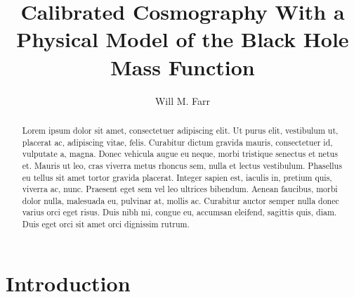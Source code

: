 \documentclass[modern]{aastex631}
\newcommand{\todo}[1]{\textcolor{cyan}{TODO: #1}}
\begin{document}
\title{Calibrated Cosmography With a Physical Model of the Black Hole Mass Function}

\author[0000-0003-1540-8562]{Will M. Farr}

\begin{abstract}
    Lorem ipsum dolor sit amet, consectetuer adipiscing elit. Ut purus elit,
    vestibulum ut, placerat ac, adipiscing vitae, felis. Curabitur dictum
    gravida mauris, consectetuer id, vulputate a, magna. Donec vehicula augue eu
    neque, morbi tristique senectus et netus et. Mauris ut leo, cras viverra
    metus rhoncus sem, nulla et lectus vestibulum. Phasellus eu tellus sit amet
    tortor gravida placerat. Integer sapien est, iaculis in, pretium quis,
    viverra ac, nunc. Praesent eget sem vel leo ultrices bibendum. Aenean
    faucibus, morbi dolor nulla, malesuada eu, pulvinar at, mollis ac. Curabitur
    auctor semper nulla donec varius orci eget risus. Duis nibh mi, congue eu,
    accumsan eleifend, sagittis quis, diam. Duis eget orci sit amet orci
    dignissim rutrum.
\end{abstract}

\section{Introduction}
\label{sec:intro}


\end{document}
